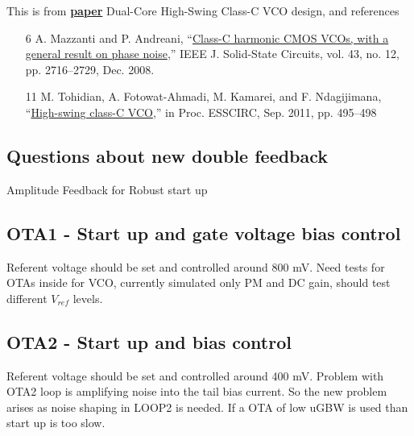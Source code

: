 \documentclass{article}
\begin{document}
This is from \href{https://www.semanticscholar.org/paper/Dual-Core-High-Swing-Class-C-VCO-design-Kim-Kim/c9551af0809604f76263af49976df9efc213bb8e}{\textbf{paper}} Dual-Core High-Swing Class-C VCO design, and references 


\begin{itemize}
	\item [6] A. Mazzanti and P. Andreani, “\href{https://ieeexplore.ieee.org/document/4684621}{Class-C harmonic CMOS
	VCOs, with a general result on phase noise},” IEEE J.
	Solid-State Circuits, vol. 43, no. 12, pp. 2716–2729,
	Dec. 2008.
	\item [11] M. Tohidian, A. Fotowat-Ahmadi, M. Kamarei, and F.
	Ndagijimana, “\href{https://ieeexplore.ieee.org/document/6045015}{High-swing class-C VCO},” in Proc.
	ESSCIRC, Sep. 2011, pp. 495–498
\end{itemize}


\subsection{Questions about new double feedback}


Amplitude Feedback for Robust start up



\subsection{OTA1 - Start up  and gate voltage bias control}

Referent voltage should be set and controlled around 800 mV. Need tests for OTAs inside for VCO, currently simulated only PM and DC gain, should test different $V_{ref}$ levels.

\subsection{OTA2 - Start up and bias control}

Referent voltage should be set and controlled around 400 mV. Problem with OTA2 loop is amplifying noise into the tail bias current. So the new problem arises as noise shaping in LOOP2 is needed. If a OTA of low uGBW is used than start up is too slow.


\end{document}
